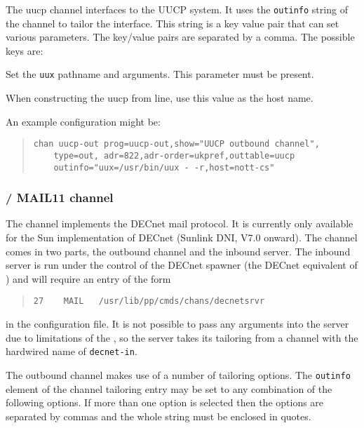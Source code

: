 The uucp channel interfaces to the UUCP system. It uses the \verb|outinfo|
string of the channel to tailor the interface. This string is a key
value pair that can set various parameters. The key/value pairs are
separated by a comma. The possible keys are:
\begin{describe}
\item[\verb|uux|:]	Set the \verb|uux| pathname and arguments.
This parameter must be present.

\item[\verb|host|:]	When constructing the uucp from line, use this
value as the host name.
\end{describe}
An example configuration might be:
\begin{quote}\small\begin{verbatim}
chan uucp-out prog=uucp-out,show="UUCP outbound channel",
    type=out, adr=822,adr-order=ukpref,outtable=uucp
    outinfo="uux=/usr/bin/uux - -r,host=nott-cs"
\end{verbatim}\end{quote}

\subsubsection {\decnet/ MAIL11 channel}
The  channel implements the DECnet mail protocol. It is
currently only available for the Sun implementation of DECnet (Sunlink
DNI, V7.0 onward). The channel comes in two parts, the outbound channel
and the inbound server. The inbound server is run under the control of
the DECnet spawner (the DECnet equivalent of ) and will
require an entry of the form

\begin{quote}\begin{verbatim}
27    MAIL   /usr/lib/pp/cmds/chans/decnetsrvr
\end{verbatim}\end{quote}

in the  configuration file.  It is not possible to
pass any arguments into the server due to limitations of the
, so the server takes its tailoring from a channel with
the hardwired name of \verb|decnet-in|.

The  outbound channel makes use of a number of tailoring
options. The \verb|outinfo| element of the channel tailoring entry
may be set to any combination of the following options. If more than
one option is selected then the options are separated by commas and
the whole string must be enclosed in quotes. 

